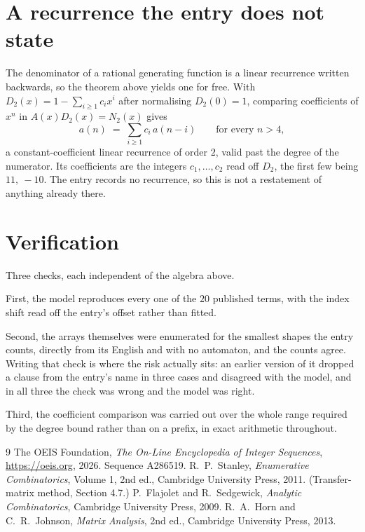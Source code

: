\documentclass[11pt,a4paper]{article}
\theoremstyle{plain}
\theoremstyle{definition}
\begin{document}
\section{A recurrence the entry does not state}

The denominator of a rational generating function is a linear recurrence written backwards, so
the theorem above yields one for free. With $D_2(x)=1-\sum_{i\ge1}c_ix^i$ after normalising
$D_2(0)=1$, comparing coefficients of $x^n$ in $A(x)D_2(x)=N_2(x)$ gives
\[
a(n)\;=\;\sum_{i\ge1}c_i\,a(n-i)\qquad\text{for every }n>4,
\]
a constant-coefficient linear recurrence of order $2$, valid past the degree of the
numerator. Its coefficients are the integers $c_1,\dots,c_{2}$ read off $D_2$, the first few being $11,\ -10$. The entry records no recurrence, so this is not a restatement of anything
already there.

\section{Verification}

Three checks, each independent of the algebra above.

First, the model reproduces every one of the $20$ published terms, with the index shift
read off the entry's offset rather than fitted.

Second, the arrays themselves were enumerated for the smallest shapes the entry counts,
directly from its English and with no automaton, and the counts agree. Writing that check is
where the risk actually sits: an earlier version of it dropped a clause from the entry's name
in three cases and disagreed with the model, and in all three the check was wrong and the model
was right.

Third, the coefficient comparison was carried out over the whole range required by the degree
bound rather than on a prefix, in exact arithmetic throughout.

\begin{thebibliography}{9}
 The OEIS Foundation, \emph{The On-Line Encyclopedia of Integer
Sequences}, \url{https://oeis.org}, 2026. Sequence A286519.
 R.~P.~Stanley, \emph{Enumerative Combinatorics}, Volume 1, 2nd ed.,
Cambridge University Press, 2011. (Transfer-matrix method, Section 4.7.)
 P.~Flajolet and R.~Sedgewick, \emph{Analytic Combinatorics}, Cambridge
University Press, 2009.
 R.~A.~Horn and C.~R.~Johnson, \emph{Matrix Analysis}, 2nd ed., Cambridge
University Press, 2013.
\end{thebibliography}
\end{document}
